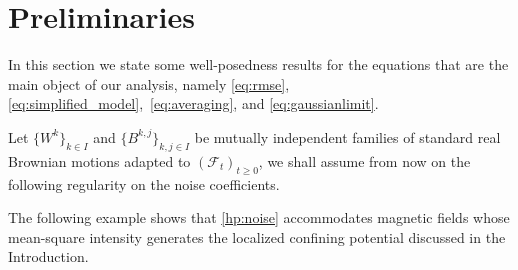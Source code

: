 \documentclass[a4paper,10pt]{amsart}
\newcommand{\R}{\mathbb{R}}
\newcommand{\expt}[1]{\mathbb{E}\left[#1\right]}
\newtheorem{hypothesis}[theorem]{Hypothesis}
\theoremstyle{remark}
\numberwithin{equation}{section}
\begin{document}
\section{Preliminaries}\label{preliminaries}
 In this section we state some well-posedness results for the equations that are the main object of our analysis, namely \eqref{eq:rmse}, \eqref{eq:simplified_model},\ \eqref{eq:averaging}, and \eqref{eq:gaussianlimit}.

 
Let $\{W^k\}_{k\in I}$ and $\{B^{k,j}\}_{k,j\in I}$ be mutually independent families of standard real Brownian motions adapted to $(\mathcal{F}_t)_{t\ge0}$, we shall assume from now on the following regularity on the noise coefficients. 
The following example shows that \cref{hp:noise} accommodates magnetic fields whose mean-square intensity generates the localized confining potential discussed in the Introduction.
\end{document}
